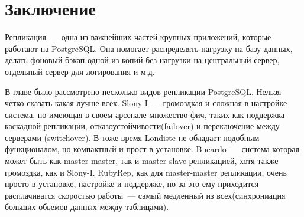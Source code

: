 \section{Заключение}
Репликация~--- одна из важнейших частей крупных приложений, которые работают на PostgreSQL. Она помогает 
распределять нагрузку на базу данных, делать фоновый бэкап одной из копий без нагрузки на центральный сервер, 
отдельный сервер для логирования и м.д.

В главе было рассмотрено несколько видов репликации PostgreSQL. Нельзя четко сказать какая лучше всех. 
Slony-I~--- громоздкая и сложная в настройке система, 
но имеющая в своем арсенале множество фич, таких как поддержка каскадной репликации, отказоустойчивости(failover) 
и переключение между серверами (switchover). В тоже время Londiste не обладает подобным функционалом, 
но компактный и прост в установке. Bucardo~--- система которая может быть как master-master, так и 
master-slave репликацией, хотя также громоздка, как и Slony-I. RubyRep, как для master-master репликации, 
очень просто в установке, настройке и поддержке, но за это ему приходится расплачиватся скоростью работы~--- самый 
медленный из всех(синхрониация больших обьемов данных между таблицами).